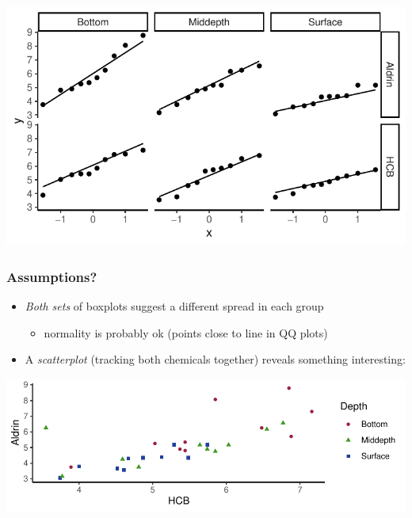 \documentclass[a4paper]{article}\usepackage[]{graphicx}\usepackage[]{xcolor}
\makeatletter
\def\maxwidth{ %
  \ifdim\Gin@nat@width>\linewidth
    \linewidth
  \else
    \Gin@nat@width
  \fi
}
\makeatother
\begin{document}
\begin{Schunk}
{\centering \includegraphics[width=\maxwidth]{figure/listings-unnamed-chunk-257-2} 

}

\end{Schunk}
\subsubsection{Assumptions?}
\begin{itemize}
	\item \textit{Both sets} of boxplots suggest a different spread in each group
	\begin{itemize}
		\item normality is probably ok (points close to line in QQ plots)
	\end{itemize}
	\item A \textit{scatterplot} (tracking both chemicals together) reveals something interesting:
\end{itemize}
\begin{Schunk}


{\centering \includegraphics[width=\maxwidth]{figure/listings-unnamed-chunk-258-1} 

}

\end{Schunk}
\end{document}
